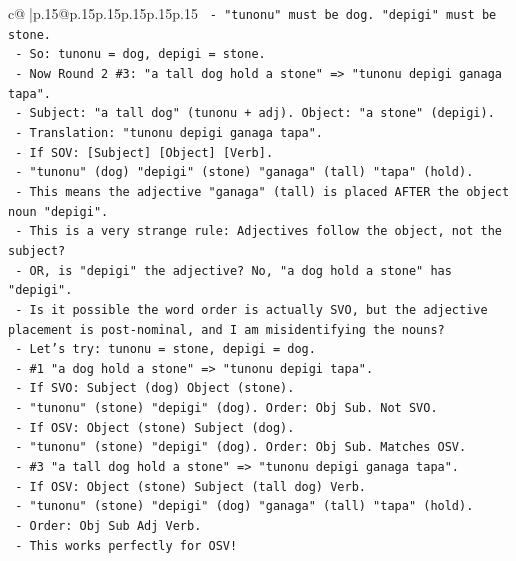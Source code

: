 \documentclass{article}
\begin{document}
{\begin{supertabular}{c@{$\;$}|p{.15\linewidth}@{}p{.15\linewidth}p{.15\linewidth}p{.15\linewidth}p{.15\linewidth}p{.15\linewidth}}
{{{\texttt{        {-} "tunonu" must be dog. "depigi" must be stone.} \\
\texttt{        {-} So: tunonu = dog, depigi = stone.} \\
\texttt{        {-} Now Round 2 \#3: "a tall dog hold a stone" => "tunonu depigi ganaga tapa".} \\
\texttt{        {-} Subject: "a tall dog" (tunonu + adj). Object: "a stone" (depigi).} \\
\texttt{        {-} Translation: "tunonu depigi ganaga tapa".} \\
\texttt{        {-} If SOV: {[}Subject{]} {[}Object{]} {[}Verb{]}.} \\
\texttt{        {-} "tunonu" (dog) "depigi" (stone) "ganaga" (tall) "tapa" (hold).} \\
\texttt{        {-} This means the adjective "ganaga" (tall) is placed AFTER the object noun "depigi".} \\
\texttt{        {-} This is a very strange rule: Adjectives follow the object, not the subject?} \\
\texttt{        {-} OR, is "depigi" the adjective? No, "a dog hold a stone" has "depigi".} \\
\texttt{        {-} Is it possible the word order is actually SVO, but the adjective placement is post{-}nominal, and I am misidentifying the nouns?} \\
\texttt{        {-} Let's try: tunonu = stone, depigi = dog.} \\
\texttt{          {-} \#1 "a dog hold a stone" => "tunonu depigi tapa".} \\
\texttt{          {-} If SVO: Subject (dog) Object (stone).} \\
\texttt{          {-} "tunonu" (stone) "depigi" (dog). Order: Obj Sub. Not SVO.} \\
\texttt{          {-} If OSV: Object (stone) Subject (dog).} \\
\texttt{          {-} "tunonu" (stone) "depigi" (dog). Order: Obj Sub. Matches OSV.} \\
\texttt{          {-} \#3 "a tall dog hold a stone" => "tunonu depigi ganaga tapa".} \\
\texttt{          {-} If OSV: Object (stone) Subject (tall dog) Verb.} \\
\texttt{          {-} "tunonu" (stone) "depigi" (dog) "ganaga" (tall) "tapa" (hold).} \\
\texttt{          {-} Order: Obj Sub Adj Verb.} \\
\texttt{          {-} This works perfectly for OSV!} \\
}}}
\end{supertabular}}
\end{document}
